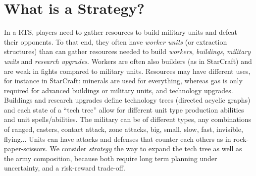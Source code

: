 \section{What is a Strategy?}

In a RTS, players need to gather resources to build military units and defeat their opponents. To that end, they often have \textit{worker units} (or extraction structures) than can gather resources needed to build \textit{workers}, \textit{buildings}, \textit{military units} and \textit{research upgrades}. Workers are often also builders (as in StarCraft) and are weak in fights compared to military units. Resources may have different uses, for instance in StarCraft: minerals are used for everything, whereas gas is only required for advanced buildings or military units, and technology upgrades. Buildings and research upgrades define technology trees (directed acyclic graphs) and each state of a ``tech tree'' allow for different unit type production abilities and unit spells/abilities. The military can be of different types, any combinations of ranged, casters, contact attack, zone attacks, big, small, slow, fast, invisible, flying... Units can have attacks and defenses that counter each others as in rock-paper-scissors. We consider \textit{strategy} the way to expand the tech tree as well as the army composition, because both require long term planning under uncertainty, and a risk-reward trade-off. 


